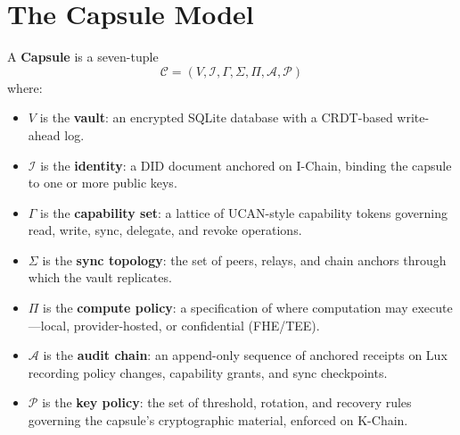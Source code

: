 

\section{The Capsule Model}
\label{sec:model}

\begin{definition}[Capsule]\label{def:capsule}
A \textbf{Capsule} is a seven-tuple
\[
  \mathcal{C} = (V, \mathcal{I}, \Gamma, \Sigma, \Pi, \mathcal{A}, \mathcal{P})
\]
where:
\begin{itemize}[nosep]
  \item $V$ is the \textbf{vault}: an encrypted SQLite database with a CRDT-based
        write-ahead log.
  \item $\mathcal{I}$ is the \textbf{identity}: a DID document anchored on I-Chain,
        binding the capsule to one or more public keys.
  \item $\Gamma$ is the \textbf{capability set}: a lattice of UCAN-style
        capability tokens governing read, write, sync, delegate, and revoke
        operations.
  \item $\Sigma$ is the \textbf{sync topology}: the set of peers, relays,
        and chain anchors through which the vault replicates.
  \item $\Pi$ is the \textbf{compute policy}: a specification of where computation
        may execute---local, provider-hosted, or confidential (FHE/TEE).
  \item $\mathcal{A}$ is the \textbf{audit chain}: an append-only sequence of
        anchored receipts on Lux recording policy changes, capability grants,
        and sync checkpoints.
  \item $\mathcal{P}$ is the \textbf{key policy}: the set of threshold, rotation,
        and recovery rules governing the capsule's cryptographic material,
        enforced on K-Chain.
\end{itemize}
\end{definition}

